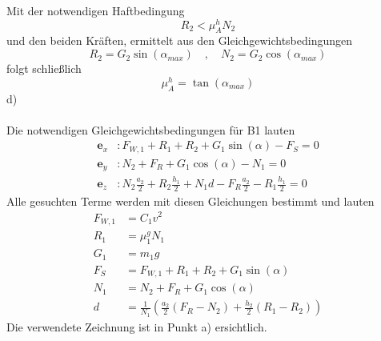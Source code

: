 Mit der notwendigen Haftbedingung
\[
	R_2 < \mu_A^hN_2
\]
und den beiden Kräften, ermittelt aus den Gleichgewichtsbedingungen
\[
	R_2 = G_2\sin(\alpha_{max}) \quad,\quad N_2 = G_2\cos(\alpha_{max})
\]
folgt schließlich
\[
	\mu_A^h = \tan(\alpha_{max})
\]
d)\\ \\
Die notwendigen Gleichgewichtsbedingungen für B1 lauten
\begin{align*}
	\textbf{e}_x &: F_{W,1} + R_1 + R_2 + G_1\sin(\alpha) - F_S = 0\\
	\textbf{e}_y &: N_2 + F_R + G_1\cos(\alpha) - N_1 = 0\\
	\textbf{e}_z &: N_2\frac{a_2}{2} + R_2\frac{h_1}{2} + N_1d - F_R\frac{a_2}{2} - R_1\frac{h_1}{2} = 0
\end{align*}
\newpage
\noindent
Alle gesuchten Terme werden mit diesen Gleichungen bestimmt und lauten
\begin{align*}
	F_{W,1} &= C_1v^2 \\
	R_1 &= \mu_1^gN_1 \\
	G_1 &= m_1g \\
	F_S &= F_{W,1} + R_1 + R_2 + G_1\sin(\alpha) \\
	N_1 &= N_2 + F_R + G_1\cos(\alpha) \\
	d &= \frac{1}{N_1}\left(\frac{a_2}{2}(F_R - N_2) + \frac{h_2}{2}(R_1 - R_2)\right)
\end{align*}
Die verwendete Zeichnung ist in Punkt a) ersichtlich. \\ \\
